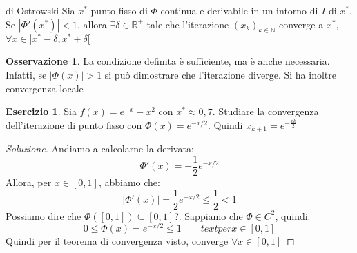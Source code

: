 \documentclass[11pt,a4paper,twoside]{article}
\theoremstyle{definition}
\newtheorem*{oss}{Osservazione}
\newtheorem*{ese}{Esercizio}
\newenvironment{sol}
	{\renewcommand\qedsymbol{$\blacksquare$}\begin{proof}[Soluzione]}
	{\end{proof}}
\begin{document}
\begin{thm}{di Ostrowski}{}
	Sia $x^*$ punto fisso di $\Phi$ continua e derivabile in un intorno di $I$ di $x^*$. Se $|\Phi'(x^*)|<1$, allora $\exists \delta \in \mathbb R^+$ tale che l'iterazione $(x_k)_{k \in \mathbb N}$ converge a $x^*$, $\forall x \in ]x^*-\delta, x^*+\delta[$
\end{thm}

\begin{oss}
	La condizione definita è sufficiente, ma è anche necessaria. Infatti, se $|\Phi(x)|>1$ si può dimostrare che l'iterazione diverge. Si ha inoltre convergenza locale
\end{oss}

\begin{ese}
	Sia $f(x) = e^{-x} - x^2$ con $x^* \approx 0,7$. Studiare la convergenza dell'iterazione di punto fisso con $\Phi(x) = e^{-x/2}$. Quindi $x_{k+1} = e^{-\frac{xk}2}$
\end{ese}

\begin{sol}
	Andiamo a calcolarne la derivata:
	\[ \Phi'(x) = -\frac 12  e^{-x/2}\]
	Allora, per $x \in [0,1]$, abbiamo che:
	\[ |\Phi'(x)| = \frac 12 e^{-x/2} \leq \frac 12 <1 \]
	Possiamo dire che $\Phi([0,1]) \subseteq [0,1]$?. Sappiamo che $\Phi \in C^2$, quindi:
	\[ 0 \leq \Phi(x) = e^{-x/2} \leq 1 \qquad text{per } x \in [0,1] \]
	Quindi per il teorema di convergenza visto, converge $\forall x \in [0,1]$
\end{sol}
\end{document}
